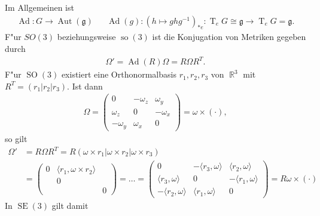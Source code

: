 \documentclass[paper=A4, twoside, chapterprefix=true, bibliography=totoc, headsepline]{scrbook}
\DeclareMathOperator{\R}{\mathbb{R}}
\DeclareMathOperator{\so}{so}
\DeclareMathOperator{\Ad}{Ad}
\DeclareMathOperator{\Aut}{Aut} %
\DeclareMathOperator{\SE}{SE}
\DeclareMathOperator{\SO}{SO} %
\DeclareMathOperator{\T}{T} %
\newcommand{\X}{\times}
\theoremstyle{nonumberbreak}
\theoremstyle{emptybreak}
\theoremstyle{break}
\begin{document}
Im Allgemeinen ist
\begin{align*}
	\Ad: G \to \Aut(\mathfrak g)
	&&
	\Ad(g): (h \mapsto g h g^{-1})_{*e}: \T_e G \cong \mathfrak g \to \T_e G = \mathfrak g.
\end{align*}
F"ur $SO(3)$ beziehungsweise $\so(3)$ ist die Konjugation von Metriken gegeben durch
\begin{align*}
	\Omega' = \Ad(R) \Omega = R \Omega R^T.
\end{align*}
F"ur $\SO(3)$ existiert eine Orthonormalbasis $r_1, r_2, r_3$ von $\R^3$ mit $R^T = (r_1 | r_2 | r_3)$.
Ist dann
\begin{align*}
	\Omega = \begin{pmatrix}
		0 & -\omega_z & \omega_y \\
		\omega_z & 0 & -\omega_x \\
		-\omega_y & \omega_x & 0
	\end{pmatrix}
	= \omega \X (\cdot),
\end{align*}
so gilt
\begin{align*}
	\Omega' &= R \Omega R^T = R (\omega \X r_1 | \omega \X r_2 | \omega \X r_3) \\
	&=
	\begin{pmatrix}
		0 & \langle r_1, \omega \X r_2 \rangle & \\
		 & 0 & \\
		 & & 0
	\end{pmatrix}
	= \ldots =
	\begin{pmatrix}
		0 & -\langle r_3, \omega \rangle & \langle r_2, \omega \rangle \\
		\langle r_3, \omega \rangle & 0 & -\langle r_1, \omega \rangle \\
		-\langle r_2, \omega \rangle & \langle r_1, \omega \rangle & 0
	\end{pmatrix}
	= R \omega \X (\cdot)
\end{align*}
In $\SE(3)$ gilt damit
\end{document}
